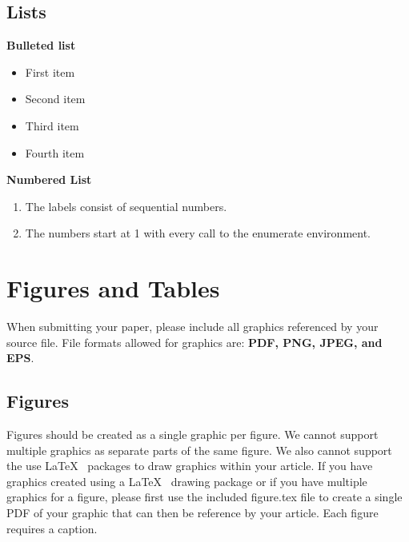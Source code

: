 \documentclass[hasAbstract,authorBox]{csmagazine}
\begin{document}
\pagebreak

\subsection{Lists}

\textbf{Bulleted list}

\begin{itemize}
	\itemsep0em 
	\item First item
	\item Second item
	\item Third item
	\item Fourth item
\end{itemize}

\textbf{Numbered List}

\begin{enumerate}
	\item The labels consist of sequential numbers.
	\item The numbers start at 1 with every call to the enumerate environment.
\end{enumerate}




\section{Figures and Tables}

When submitting your paper, please include all graphics referenced by your source file. File formats allowed for graphics are: \textbf{PDF, PNG, JPEG, and EPS}.

\subsection{Figures}

Figures should be created as a single graphic per figure. We cannot support multiple graphics as separate parts of the same figure. We also cannot support the use \LaTeX~ packages to draw graphics within your article. If you have graphics created using a \LaTeX~ drawing package or if you have multiple graphics for a figure, please first use the included figure.tex file to create a single PDF of your graphic that can then be reference by your article. Each figure requires a caption. 
\end{document}
